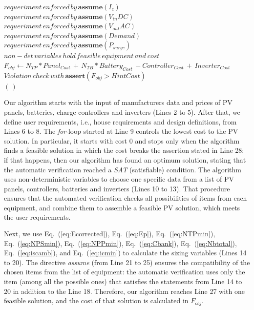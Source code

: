 \documentclass[10pt,conference]{IEEEtran}
\begin{document}
\begin{algorithm}
\begin{algorithmic}[1]
\begin{scriptsize}
 	\STATE $requeriment \, enforced \, by \, \textbf{assume}(I_{c})$ \\
	\STATE $requeriment \, enforced \, by \, \textbf{assume}(V_{in}DC)$ \\
	\STATE $requeriment \, enforced \, by \, \textbf{assume}(V_{out}AC)$ \\
	\STATE $requeriment \, enforced \, by \, \textbf{assume}(Demand)$ \\
	\STATE $requeriment \, enforced \, by \, \textbf{assume}(P_{surge})$ \\
	\STATE $non-det \, variables \, hold \, feasible \, equipment \, and \ cost $ \\
	\STATE $F_{obj} \leftarrow  N_{TP}*Panel_{Cost} \, + \, N_{TB}*Battery_{Cost} \, + Controller_{Cost} \, + \, Inverter_{Cost}$ \\
	\STATE $Violation \, check \, with \, \textbf{assert}(F_{obj} > HintCost)$ \\
  \ENDFOR
 \RETURN $(\,)$ 
  \end{scriptsize}
 \end{algorithmic} 
 \label{alg:verification-algorithm}
 \end{algorithm}
 
Our algorithm starts with the input of manufacturers data and prices of PV panels, batteries, charge controllers and inverters (Lines 2 to 5). After that, we define user requirements, i.e., house requirements and design definitions, from Lines 6 to 8. The \textit{for}-loop started at Line 9 controls the lowest cost to the PV solution. In particular, it starts with cost $0$ and stops only when the algorithm finds a feasible solution in which the cost breaks the assertion stated in Line 28; if that happens, then our algorithm has found an optimum solution, stating that the automatic verification reached a \textit{SAT} (satisfiable) condition. The algorithm uses non-deterministic variables to choose one specific data from a list of PV panels, controllers, batteries and inverters (Lines 10 to 13). That procedure ensures that the automated verification checks all possibilities of items from each equipment, and combine them to assemble a feasible PV solution, which meets the user requirements.

Next, we use Eq.~(\ref{eq:Ecorrected}), Eq.~(\ref{eq:Ep}), Eq.~(\ref{eq:NTPmin}), Eq.~(\ref{eq:NPSmin}), Eq.~(\ref{eq:NPPmin}), Eq.~(\ref{eq:Cbank}), Eq.~(\ref{eq:Nbtotal}), Eq.~(\ref{eq:iscamb}), and Eq.~(\ref{eq:icmin}) to calculate the sizing variables (Lines 14 to 20). The directive \textit{assume} (from Line 21 to 25) ensures the compatibility of the chosen items from the list of equipment: the automatic verification uses only the item (among all the possible ones) that satisfies the statements from Line 14 to 20 in addition to the Line 18. Therefore, our algorithm reaches Line 27 with one feasible solution, and the cost of that solution is calculated in $F_{obj}$.
\end{document}
